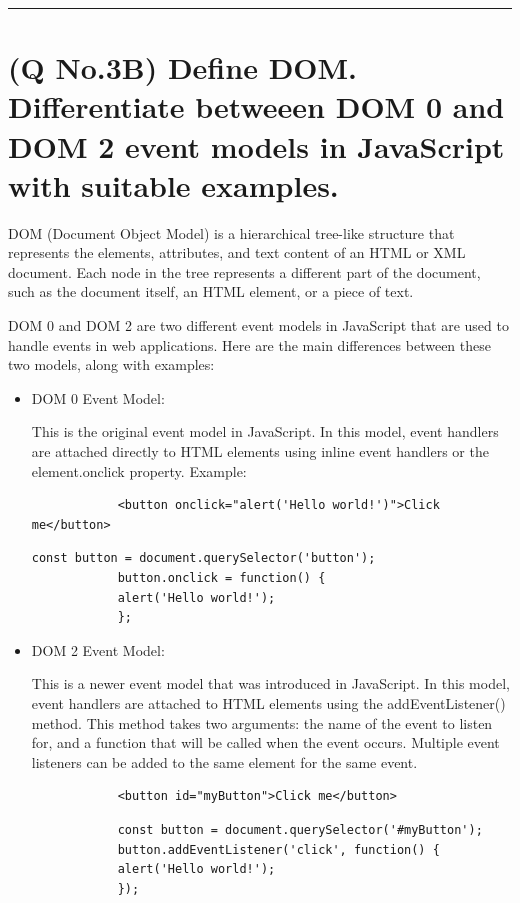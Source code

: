 \documentclass[11pt]{article}
\begin{document}
\noindent\rule{\linewidth}{0.4pt}
\section{(Q No.3B) Define DOM. Differentiate betweeen DOM 0 and DOM 2 event models in JavaScript with suitable examples.} 
DOM (Document Object Model) is a hierarchical tree-like structure that represents the elements, attributes, and text content of an HTML or XML document. Each node in the tree represents a different part of the document, such as the document itself, an HTML element, or a piece of text.

DOM 0 and DOM 2 are two different event models in JavaScript that are used to handle events in web applications. Here are the main differences between these two models, along with examples:
\begin{itemize}
    
    \item DOM 0 Event Model:

        This is the original event model in JavaScript.
        In this model, event handlers are attached directly to HTML elements using inline event handlers or the element.onclick property.
        Example:
        \begin{lstlisting}
            <button onclick="alert('Hello world!')">Click me</button>
        \end{lstlisting}

        \begin{lstlisting}[language=html]
            const button = document.querySelector('button');
            button.onclick = function() {
            alert('Hello world!');
            };
        \end{lstlisting}
    \item DOM 2 Event Model:

        This is a newer event model that was introduced in JavaScript.
        In this model, event handlers are attached to HTML elements using the addEventListener() method.
        This method takes two arguments: the name of the event to listen for, and a function that will be called when the event occurs.
        Multiple event listeners can be added to the same element for the same event.
        \begin{lstlisting}
            <button id="myButton">Click me</button>
        \end{lstlisting}

        \begin{lstlisting}
            const button = document.querySelector('#myButton');
            button.addEventListener('click', function() {
            alert('Hello world!');
            });
        \end{lstlisting}



\end{itemize}
\end{document}
